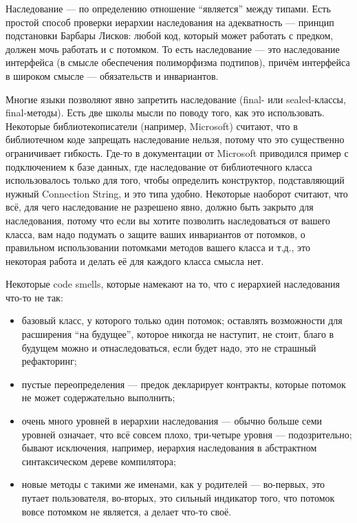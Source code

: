 \documentclass[a5paper]{article}
\begin{document}
Наследование --- по определению отношение ``является'' между типами. Есть простой способ проверки иерархии наследования на адекватность --- принцип подстановки Барбары Лисков: любой код, который может работать с предком, должен мочь работать и с потомком. То есть наследование --- это наследование интерфейса (в смысле обеспечения полиморфизма подтипов), причём интерфейса в широком смысле --- обязательств и инвариантов.

Многие языки позволяют явно запретить наследование (final- или sealed-классы, final-методы). Есть две школы мысли по поводу того, как это использовать. Некоторые библиотекописатели (например, Microsoft) считают, что в библиотечном коде запрещать наследование нельзя, потому что это существенно ограничивает гибкость. Где-то в документации от Microsoft приводился пример с подключением к базе данных, где наследование от библиотечного класса использовалось только для того, чтобы определить конструктор, подставляющий нужный Connection String, и это типа удобно. Некоторые наоборот считают, что всё, для чего наследование не разрешено явно, должно быть закрыто для наследования, потому что если вы хотите позволить наследоваться от вашего класса, вам надо подумать о защите ваших инвариантов от потомков, о правильном использовании потомками методов вашего класса и т.д., это некоторая работа и делать её для каждого класса смысла нет.

Некоторые code smells, которые намекают на то, что с иерархией наследования что-то не так:

\begin{itemize}
	\item базовый класс, у которого только один потомок; оставлять возможности для расширения ``на будущее'', которое никогда не наступит, не стоит, благо в будущем можно и отнаследоваться, если будет надо, это не страшный рефакторинг;
	\item пустые переопределения --- предок декларирует контракты, которые потомок не может содержательно выполнить;
	\item очень много уровней в иерархии наследования --- обычно больше семи уровней означает, что всё совсем плохо, три-четыре уровня --- подозрительно; бывают исключения, например, иерархия наследования в абстрактном синтаксическом дереве компилятора;
	\item новые методы с такими же именами, как у родителей --- во-первых, это путает пользователя, во-вторых, это сильный индикатор того, что потомок вовсе потомком не является, а делает что-то своё.
\end{itemize}
\end{document}
